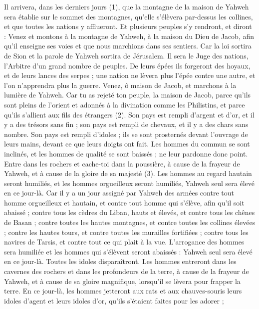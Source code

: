 \begin{multicols}{2}
Il arrivera, dans les derniers jours (1), que la montagne de la maison de Yahweh sera établie sur le sommet des montagnes, qu'elle s’élèvera par-dessus les collines, et que toutes les nations y afflueront.
Et plusieurs peuples s’y rendront, et diront : Venez et montons à la montagne de Yahweh, à la maison du Dieu de Jacob, afin qu’il enseigne ses voies et que nous marchions dans ses sentiers. Car la loi sortira de Sion et la parole de Yahweh sortira de Jérusalem.
Il sera le Juge des nations, l’Arbitre d’un grand nombre de peuples. De leurs épées ils forgeront des hoyaux, et de leurs lances des serpes ; une nation ne lèvera plus l'épée contre une autre, et l’on n’apprendra plus la guerre.
Venez, ô maison de Jacob, et marchons à la lumière de Yahweh.
Car tu as rejeté ton peuple, la maison de Jacob, parce qu'ils sont pleins de l’orient et adonnés à la divination comme les Philistins, et parce qu’ils s’allient aux fils des étrangers (2).
Son pays est rempli d'argent et d'or, et il y a des trésors sans fin ; son pays est rempli de chevaux, et il y a des chars sans nombre.
Son pays est rempli d'idoles ; ils se sont prosternés devant l'ouvrage de leurs mains, devant ce que leurs doigts ont fait.
Les hommes du commun se sont inclinés, et les hommes de qualité se sont baissés ; ne leur pardonne donc point.
Entre dans les rochers et cache-toi dans la poussière, à cause de la frayeur de Yahweh, et à cause de la gloire de sa majesté (3).
Les hommes au regard hautain seront humiliés, et les hommes orgueilleux seront humiliés, Yahweh seul sera élevé en ce jour-là.
Car il y a un jour assigné par Yahweh des armées contre tout homme orgueilleux et hautain, et contre tout homme qui s'élève, afin qu’il soit abaissé ;
contre tous les cèdres du Liban, hauts et élevés, et contre tous les chênes de Basan ;
contre toutes les hautes montagnes, et contre toutes les collines élevées ;
contre les hautes tours, et contre toutes les murailles fortifiées ;
contre tous les navires de Tarsis, et contre tout ce qui plait à la vue.
L’arrogance des hommes sera humiliée et les hommes qui s'élèvent seront abaissés :
Yahweh seul sera élevé en ce jour-là. Toutes les idoles disparaîtront.
Les hommes entreront dans les cavernes des rochers et dans les profondeurs de la terre, à cause de la frayeur de Yahweh, et à cause de sa gloire magnifique, lorsqu'il se lèvera pour frapper la terre.
En ce jour-là, les hommes jetteront aux rats et aux chauves-souris leurs idoles d’agent et leurs idoles d’or, qu’ils s’étaient faites pour les adorer ;

\end{multicols}

